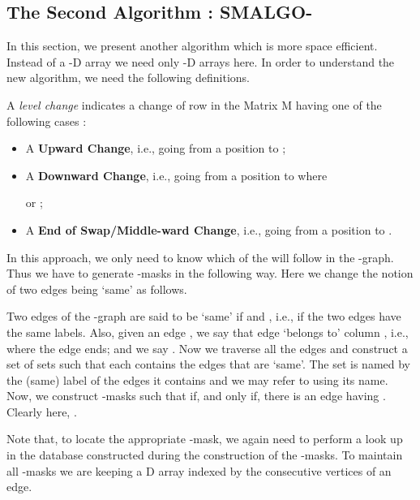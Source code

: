 \documentclass{llncs}
\newcommand{\rom}[1]{\uppercase\expandafter{\romannumeral #1\relax}}
\begin{document}
{\subsection{\label{NewAlgo}The Second Algorithm : SMALGO-\rom{2}} 

In this section, we present another algorithm which is more space efficient. Instead of a -D array we need only -D arrays here. In order to understand the new algorithm, we need the following definitions.

\begin{definition}\label{levelchange}
A \emph{level change} indicates a change of row in the Matrix M having one of the following cases :
\begin{itemize}
\item A \textbf{Upward Change}, i.e., going from a position  to ; 

\item A \textbf{Downward Change}, i.e., going from a position  to  where 

 or ; 

\item A \textbf{End of Swap/Middle-ward Change}, i.e., going from a position  to . 
\end{itemize}

\end{definition}
In this approach, we only need to know which
of the  will follow  in the -graph. Thus we have to generate -masks in the following way. Here we change the notion of two edges being `same' as follows.


Two edges  of the -graph are said to be `same' if  and
, i.e., if the two edges have the same labels.
Also, given an edge , we say
that edge  `belongs to' column , i.e., where the edge
ends; and we say . 
Now we traverse all the edges and construct a set of sets
 such that each  contains the edges that are `same'. The set  is named by
the (same) label of the edges it contains and we may refer to 
using its name. Now, we construct -masks  such that  if, and only if, there is an
edge  having . Clearly here, .


Note that, to locate the appropriate -mask, we again need to perform a look up in the database constructed during the construction of the -masks. To maintain all -masks we are keeping a D array indexed by the consecutive vertices of an edge.


}
\end{document}
